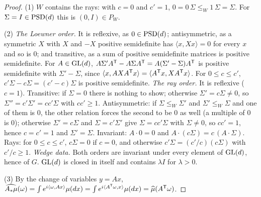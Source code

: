 \begin{proof}
\leanok
(1) $W$ contains the rays: with $c = 0$ and $c' = 1$, $0 = 0\,\Sigma \le_W 1\,\Sigma = \Sigma$. For
$\Sigma = I \in \mathrm{PSD}(d)$ this is $(0, I) \in P_W$.

(2) \emph{The Loewner order.} It is reflexive, as $0 \in \mathrm{PSD}(d)$; antisymmetric, as a symmetric
$X$ with $X$ and $-X$ positive semidefinite has $\langle x, Xx\rangle = 0$ for every $x$ and so is
$0$; and transitive, as a sum of positive semidefinite matrices is positive semidefinite. For
$A \in \mathrm{GL}(d)$, $A\Sigma'A^{\mathsf{T}} - A\Sigma A^{\mathsf{T}} = A(\Sigma' - \Sigma)A^{\mathsf{T}}$ is positive
semidefinite with $\Sigma' - \Sigma$, since $\langle x, AXA^{\mathsf{T}}x\rangle = \langle A^{\mathsf{T}}x,
XA^{\mathsf{T}}x\rangle$. For $0 \le c \le c'$, $c'\Sigma - c\Sigma = (c' - c)\Sigma$ is positive
semidefinite. \emph{The ray order.} It is reflexive ($c = 1$). Transitive: if $\Sigma = 0$ there is
nothing to show; otherwise $\Sigma' = c\Sigma \ne 0$, so $\Sigma'' = c'\Sigma' = cc'\Sigma$ with
$cc' \ge 1$. Antisymmetric: if $\Sigma \le_W \Sigma'$ and $\Sigma' \le_W \Sigma$ and one of them is
$0$, the other relation forces the second to be $0$ as well (a multiple of $0$ is $0$); otherwise
$\Sigma' = c\Sigma$ and $\Sigma = c'\Sigma'$ give $\Sigma = cc'\Sigma$ with $\Sigma \ne 0$, so
$cc' = 1$, hence $c = c' = 1$ and $\Sigma' = \Sigma$. Invariant: $A \cdot 0 = 0$ and
$A \cdot (c\Sigma) = c\,(A \cdot \Sigma)$. Rays: for $0 \le c \le c'$, $c\Sigma = 0$ if $c = 0$,
and otherwise $c'\Sigma = (c'/c)(c\Sigma)$ with $c'/c \ge 1$. \emph{Wedge data.} Both orders are
invariant under every element of $\mathrm{GL}(d)$, hence of $G$. $\mathrm{GL}(d)$ is closed in itself and contains
$\lambda I$ for $\lambda > 0$.

(3) By the change of variables $y = Ax$,
$\widehat{A_*\mu}(\omega) = \int e^{i\langle\omega,Ax\rangle}\mu(dx)
= \int e^{i\langle A^{\mathsf{T}}\omega,x\rangle}\mu(dx) = \widehat\mu(A^{\mathsf{T}}\omega)$.
\end{proof}

